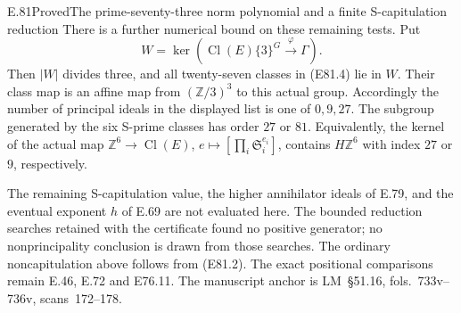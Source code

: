 \begin{statement}{E.81}{Proved}{The prime-seventy-three norm polynomial and a finite S-capitulation reduction}
There is a further numerical bound on these remaining
tests. Put
\[
 W=\ker\!\left(
    \operatorname{Cl}(E)\{3\}^{G}
       \xrightarrow{\ \varphi\ }\Gamma\right).
 \tag{E81.8}
\]
Then $|W|$ divides three, and all twenty-seven classes in
(E81.4) lie in $W$. Their class map is an affine map from
$(\mathbb Z/3)^3$ to this actual group. Accordingly the
number of principal ideals in the displayed list is one
of $0,9,27$.
The subgroup generated by the six S-prime classes has
order $27$ or $81$. Equivalently, the kernel of the actual
map $\mathbb Z^6\to\operatorname{Cl}(E)$,
$e\mapsto[\prod_i\mathfrak S_i^{e_i}]$, contains
$H\mathbb Z^6$ with index $27$ or $9$, respectively.

The remaining S-capitulation value, the higher annihilator
ideals of E.79, and the eventual exponent $h$ of E.69 are
not evaluated here. The bounded reduction searches retained
with the certificate found no positive generator; no
nonprincipality conclusion is drawn from those searches.
The ordinary noncapitulation above follows from (E81.2).
The exact positional comparisons remain E.46, E.72 and
E76.11. The manuscript anchor is LM~\S51.16,
fols.~733v--736v, scans~172--178.
\end{statement}

